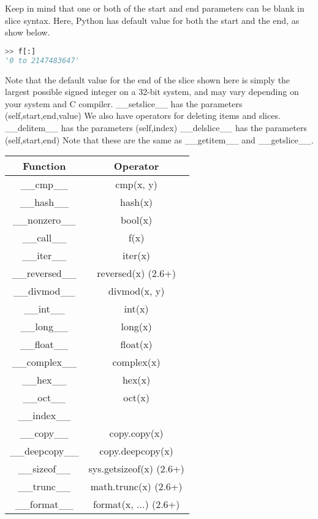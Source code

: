 Keep in mind that one or both of the start and end parameters can be blank in
slice syntax. Here, Python has default value for both the start and the end, as
show below.
\lstset{basicstyle=\scriptsize, numbers=left, captionpos=b, tabsize=4}
\begin{lstlisting}[caption=Slice Limits,language={Python},
xleftmargin=15pt, label=lst:slicelimits]
>> f[:]
'0 to 2147483647'
\end{lstlisting}

Note that the default value for the end of the slice shown here is simply the
largest possible signed integer on a 32-bit system, and may vary depending on
your system and C compiler.
\_\_setslice\_\_ has the parameters (self,start,end,value)
We also have operators for deleting items and slices.
\_\_delitem\_\_ has the parameters (self,index)
\_\_delslice\_\_ has the parameters (self,start,end)
Note that these are the same as \_\_getitem\_\_ and \_\_getslice\_\_.

\begin{tabular}{|c|c|} \hline
Function&	Operator \\ \hline
\_\_cmp\_\_ &	cmp(x, y) \\ \hline
\_\_hash\_\_ &	hash(x) \\ \hline
\_\_nonzero\_\_ &	bool(x) \\ \hline
\_\_call\_\_ &	f(x) \\ \hline
\_\_iter\_\_ &	iter(x) \\ \hline
\_\_reversed\_\_ &	reversed(x) (2.6+) \\ \hline
\_\_divmod\_\_ &	divmod(x, y) \\ \hline
\_\_int\_\_ &	int(x) \\ \hline
\_\_long\_\_ &	long(x) \\ \hline
\_\_float\_\_ &	float(x) \\ \hline
\_\_complex\_\_ &	complex(x) \\ \hline
\_\_hex\_\_ &	hex(x) \\ \hline
\_\_oct\_\_ &	oct(x) \\ \hline
\_\_index\_\_ &	 \\ \hline
\_\_copy\_\_ &	copy.copy(x) \\ \hline
\_\_deepcopy\_\_ &	copy.deepcopy(x) \\ \hline
\_\_sizeof\_\_ &	sys.getsizeof(x) (2.6+) \\ \hline
\_\_trunc\_\_ &	math.trunc(x) (2.6+) \\ \hline
\_\_format\_\_ &	format(x, ...) (2.6+) \\ \hline
\end{tabular}

